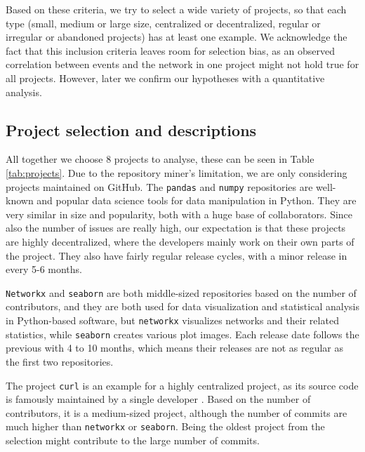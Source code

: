 Based on these criteria, we try to select a wide variety of projects, so that each type (small, medium or large size, centralized or decentralized, regular or irregular or abandoned projects) has at least one example. We acknowledge the fact that this inclusion criteria leaves room for selection bias, as an observed correlation between events and the network in one project might not hold true for all projects. However, later we confirm our hypotheses with a quantitative analysis.

\subsection{Project selection and descriptions}

All together we choose 8 projects to analyse, these can be seen in Table \ref{tab:projects}. Due to the repository miner's limitation, we are only considering projects maintained on GitHub. The \texttt{pandas} and \texttt{numpy} repositories are well-known and popular data science tools for data manipulation in Python. They are very similar in size and popularity, both with a huge base of collaborators. Since also the number of issues are really high, our expectation is that these projects are highly decentralized, where the developers mainly work on their own parts of the project. They also have fairly regular release cycles, with a minor release in every 5-6 months.

\texttt{Networkx} and \texttt{seaborn} are both middle-sized repositories based on the number of contributors, and they are both used for data visualization and statistical analysis in Python-based software, but \texttt{networkx} visualizes networks and their related statistics, while \texttt{seaborn} creates various plot images. Each release date follows the previous with 4 to 10 months, which means their releases are not as regular as the first two repositories.

The project \texttt{curl} is an example for a highly centralized project, as its source code is famously maintained by a single developer \cite{crowstonHierarchyCentralizationFree2006}. Based on the number of contributors, it is a medium-sized project, although the number of commits are much higher than \texttt{networkx} or \texttt{seaborn}. Being the oldest project from the selection might contribute to the large number of commits.


